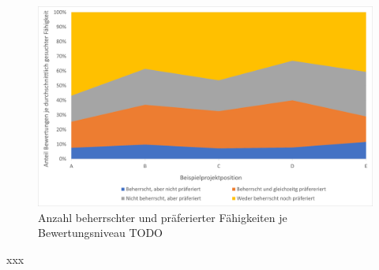 \begin{figure}[h]
	\centering
	\includegraphics[width=1\textwidth]{gfx/anteil-bewertungen-je-projektposition.png}
	\caption{Anzahl beherrschter und präferierter Fähigkeiten je Bewertungsniveau TODO}
	\label{fig:ergebnisse:analyse:abb5}
\end{figure}

xxx

